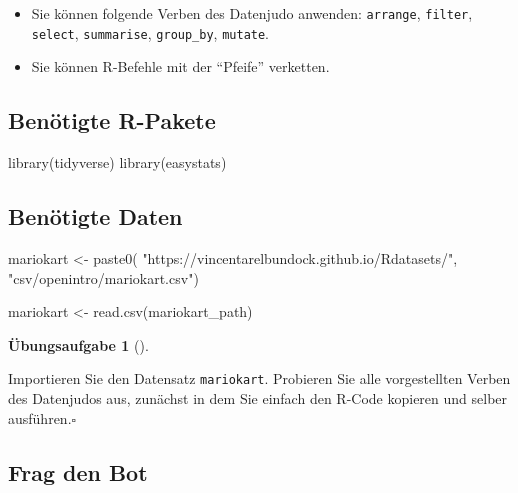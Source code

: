 \documentclass[
  a4paper,
]{scrbook}
\newenvironment{Shaded}{\begin{snugshade}}{\end{snugshade}}
\newcommand{\FunctionTok}[1]{\textcolor[rgb]{0.28,0.35,0.67}{#1}}
\newcommand{\NormalTok}[1]{\textcolor[rgb]{0.00,0.23,0.31}{#1}}
\newcommand{\OtherTok}[1]{\textcolor[rgb]{0.00,0.23,0.31}{#1}}
\newcommand{\StringTok}[1]{\textcolor[rgb]{0.13,0.47,0.30}{#1}}
\providecommand{\tightlist}{%
  \setlength{\itemsep}{0pt}\setlength{\parskip}{0pt}}\usepackage{longtable,booktabs,array}
\theoremstyle{definition}
\theoremstyle{definition}
\theoremstyle{definition}
\newtheorem{exercise}{Übungsaufgabe}[chapter]
\theoremstyle{remark}
\begin{document}
\begin{itemize}
\tightlist
\item
  Sie können folgende Verben des Datenjudo anwenden: \texttt{arrange},
  \texttt{filter}, \texttt{select}, \texttt{summarise},
  \texttt{group\_by}, \texttt{mutate}.
\item
  Sie können R-Befehle mit der ``Pfeife'' verketten.
\end{itemize}

\subsection{Benötigte R-Pakete}\label{benuxf6tigte-r-pakete}

\begin{Shaded}
\begin{Highlighting}[]
\FunctionTok{library}\NormalTok{(tidyverse)}
\FunctionTok{library}\NormalTok{(easystats)}
\end{Highlighting}
\end{Shaded}

\subsection{Benötigte Daten}\label{benuxf6tigte-daten-1}

\begin{Shaded}
\begin{Highlighting}[]
\NormalTok{mariokart }\OtherTok{\textless{}{-}} \FunctionTok{paste0}\NormalTok{(}
  \StringTok{"https://vincentarelbundock.github.io/Rdatasets/"}\NormalTok{,}
  \StringTok{"csv/openintro/mariokart.csv"}\NormalTok{)}

\NormalTok{mariokart }\OtherTok{\textless{}{-}} \FunctionTok{read.csv}\NormalTok{(mariokart\_path)}
\end{Highlighting}
\end{Shaded}

\begin{exercise}[]\protect\hypertarget{exr-los}{}\label{exr-los}

Importieren Sie den Datensatz \texttt{mariokart}. Probieren Sie alle
vorgestellten Verben des Datenjudos aus, zunächst in dem Sie einfach den
R-Code kopieren und selber ausführen.\(\square\)

\end{exercise}

\subsection{Frag den Bot}\label{frag-den-bot}
\end{document}
